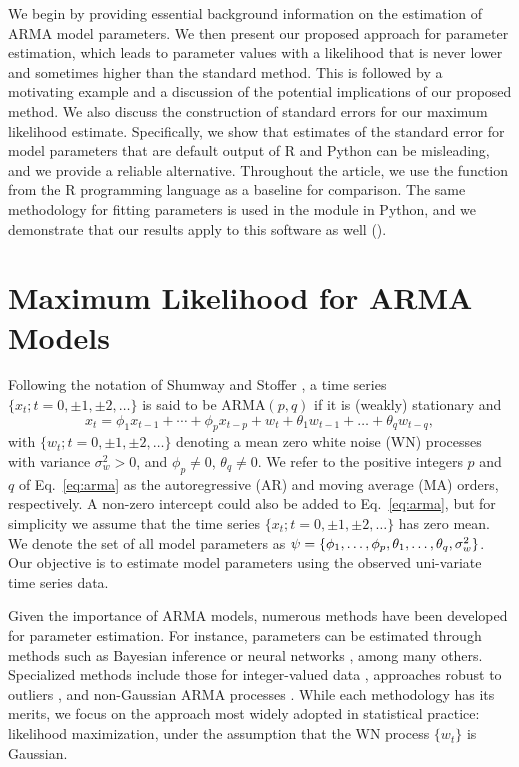 We begin by providing essential background information on the estimation of ARMA model parameters.
We then present our proposed approach for parameter estimation, which leads to parameter values with a likelihood that is never lower and sometimes higher than the standard method.
This is followed by a motivating example and a discussion of the potential implications of our proposed method.
We also discuss the construction of standard errors for our maximum likelihood estimate.
Specifically, we show that estimates of the standard error for model parameters that are default output of R and Python can be misleading, and we provide a reliable alternative.
Throughout the article, we use the  function from the R programming language as a baseline for comparison.
The same methodology for fitting parameters is used in the  module in Python, and we demonstrate that our results apply to this software as well ().

\section{Maximum Likelihood for ARMA Models}

Following the notation of Shumway and Stoffer \cite{shumway2017}, a time series $\{x_t; t = 0, \pm1, \pm2, \ldots\}$ is said to be $\text{ARMA}(p, q)$ if it is (weakly) stationary and
\begin{equation}
  x_t = \phi_1x_{t - 1} + \cdots + \phi_px_{t - p} + w_t + \theta_1w_{t-1} + \ldots + \theta_qw_{t - q}, \label{eq:arma}
\end{equation}
with $\{w_t; t = 0, \pm1, \pm2, \ldots\}$ denoting a mean zero white noise (WN) processes with variance $\sigma_w^2 > 0$, and $\phi_p \neq 0$, $\theta_q \neq 0$.
We refer to the positive integers $p$ and $q$ of Eq.~\ref{eq:arma} as the autoregressive (AR) and moving average (MA) orders, respectively.
A non-zero intercept could also be added to Eq.~\ref{eq:arma}, but for simplicity we assume that the time series $\{x_t; t = 0, \pm1, \pm2, \ldots\}$ has zero mean.
We denote the set of all model parameters as $\psi = \{\phi_1, \ldots, \phi_p, \theta_1, \ldots, \theta_q, \sigma_w^2\}$.
Our objective is to estimate model parameters using the observed uni-variate time series data.

Given the importance of ARMA models, numerous methods have been developed for parameter estimation.
For instance, parameters can be estimated through methods such as Bayesian inference \cite{monahan83,chib94} or neural networks \cite{chon97}, among many others.
Specialized methods include those for integer-valued data \cite{weiss24}, approaches robust to outliers \cite{chakhchoukh10}, and non-Gaussian ARMA processes \cite{lii90}.
While each methodology has its merits, we focus on the approach most widely adopted in statistical practice: likelihood maximization, under the assumption that the WN process $\{w_t\}$ is Gaussian.

